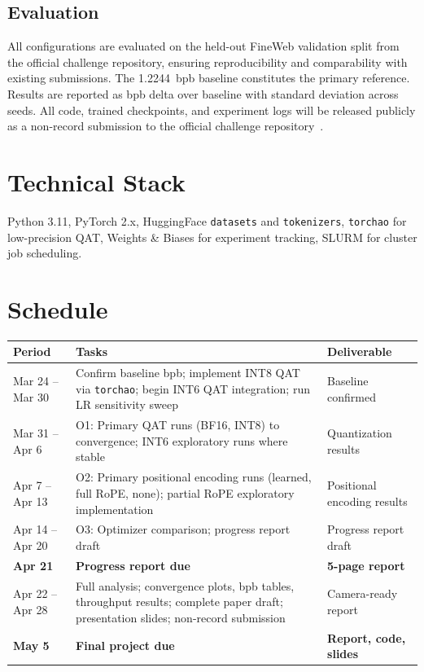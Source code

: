 \documentclass[12pt, letterpaper]{article}
\begin{document}
\subsection{Evaluation}

All configurations are evaluated on the held-out FineWeb
validation split from the official challenge repository,
ensuring reproducibility and comparability with existing
submissions. The 1.2244~bpb baseline constitutes the primary
reference. Results are reported as bpb delta over baseline
with standard deviation across seeds. All code, trained
checkpoints, and experiment logs will be released publicly
as a non-record submission to the official challenge
repository~\cite{paramgolf2026}.

\section{Technical Stack}

Python 3.11, PyTorch 2.x, HuggingFace \texttt{datasets} and
\texttt{tokenizers}, \texttt{torchao} for low-precision QAT,
Weights \& Biases for experiment tracking, SLURM for cluster
job scheduling.

\section{Schedule}

\begin{longtable}{@{}p{2.8cm} p{8cm} p{2.8cm}@{}}
\toprule
\textbf{Period} & \textbf{Tasks} & \textbf{Deliverable} \\
\midrule
\endfirsthead
Mar 24 -- Mar 30 &
Confirm baseline bpb; implement INT8
QAT via \texttt{torchao}; begin INT6
QAT integration; run LR sensitivity
sweep &
Baseline confirmed \\[4pt]
Mar 31 -- Apr 6 &
O1: Primary QAT runs (BF16, INT8)
to convergence; INT6 exploratory
runs where stable &
Quantization results \\[4pt]
Apr 7 -- Apr 13 &
O2: Primary positional encoding
runs (learned, full RoPE, none);
partial RoPE exploratory
implementation &
Positional encoding results \\[4pt]
Apr 14 -- Apr 20 &
O3: Optimizer comparison; progress
report draft &
Progress report draft \\[4pt]
\textbf{Apr 21} &
\textbf{Progress report due} &
\textbf{5-page report} \\[4pt]
Apr 22 -- Apr 28 &
Full analysis; convergence plots,
bpb tables, throughput results;
complete paper draft; presentation
slides; non-record submission &
Camera-ready report \\[4pt]
\textbf{May 5} &
\textbf{Final project due} &
\textbf{Report, code, slides} \\
\bottomrule
\end{longtable}
\end{document}
